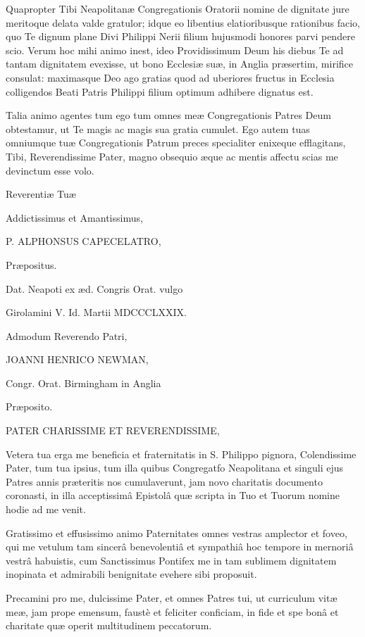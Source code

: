 Quapropter Tibi Neapolitanæ Congregationis Oratorii nomine de
dignitate jure meritoque delata valde gratulor; idque eo libentius
elatioribusque rationibus facio, quo Te dignum plane Divi Philippi
Nerii filium hujusmodi honores parvi pendere scio. Verum hoc mihi
animo inest, ideo Providissimum Deum his diebus Te ad tantam
dignitatem evexisse, ut bono Ecclesiæ suæ, in Anglia præsertim,
mirifice consulat: maximasque Deo ago gratias quod ad uberiores
fructus in Ecclesia colligendos Beati Patris Philippi filium optimum
adhibere dignatus est.

Talia animo agentes tum ego tum omnes meæ Congregationis Patres
Deum obtestamur, ut Te magis ac magis sua gratia cumulet. Ego autem
tuas omniumque tuæ Congregationis Patrum preces specialiter enixeque
efflagitans, Tibi, Reverendissime Pater, magno obsequio æque ac
mentis affectu scias me devinctum esse volo.

Reverentiæ Tuæ

Addictissimus et Amantissimus,

P. ALPHONSUS CAPECELATRO,

Præpositus.

Dat. Neapoti ex æd. Congris Orat. vulgo

Girolamini V. Id. Martii MDCCCLXXIX.

Admodum Reverendo Patri,

JOANNI HENRICO NEWMAN,

Congr. Orat. Birmingham in Anglia

Præposito.


PATER CHARISSIME ET REVERENDISSIME,

Vetera tua erga me beneficia et fraternitatis in S. Philippo pignora,
Colendissime Pater, tum tua ipsius, tum illa quibus Congregatfo
Neapolitana et singuli ejus Patres annis præteritis nos cumulaverunt,
jam novo charitatis documento coronasti, in illa acceptissimâ
Epistolâ quæ scripta in Tuo et Tuorum nomine hodie ad me venit.

Gratissimo et effusissimo animo Paternitates omnes vestras
amplector et foveo, qui me vetulum tam sincerâ benevolentiâ et
sympathiâ hoc tempore in mernoriâ vestrâ habuistis, cum
Sanctissimus Pontifex me in tam sublimem dignitatem inopinata et
admirabili benignitate evehere sibi proposuit.

Precamini pro me, dulcissime Pater, et omnes Patres tui, ut
curriculum vitæ meæ, jam prope emensum, faustè et feliciter
conficiam, in fide et spe bonâ et charitate quæ operit multitudinem
peccatorum.

